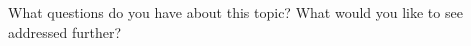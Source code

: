 \documentclass{ximera}
\begin{document}






What questions do you have about this topic?  What would you like to see addressed further?
\begin{free-response}
\end{free-response}
\end{document}
